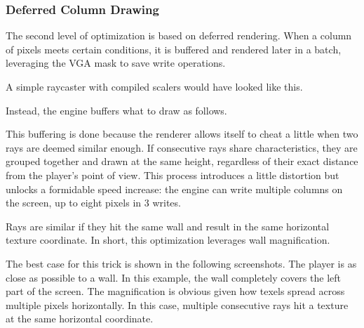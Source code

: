 \subsubsection{Deferred Column Drawing}
The second level of optimization is based on deferred rendering. When a column of pixels meets certain conditions, it is buffered and rendered later in a batch, leveraging the VGA mask to save write operations.\\
\par 
A simple raycaster with compiled scalers would have looked like this.\\

\begin{minipage}{\textwidth}

\end{minipage}
\par
Instead, the engine buffers what to draw as follows.\\
\par
\begin{minipage}{\textwidth}

\end{minipage}

\par
This buffering is done because the renderer allows itself to cheat a little when two rays are deemed similar enough. If consecutive rays share characteristics, they are grouped together and drawn at the same height, regardless of their exact distance from the player's point of view. This process introduces a little distortion but unlocks a formidable speed increase: the engine can write multiple columns on the screen, up to eight pixels in 3 writes.\\
\par
Rays are similar if they hit the same wall and result in the same  horizontal texture coordinate. In short, this optimization leverages wall magnification.\\
\par
The best case for this trick is shown in the following screenshots. The player is as close as possible to a wall. In this example, the wall completely covers the left part of the screen. The magnification is obvious given how texels spread across multiple pixels horizontally. In this case, multiple consecutive rays hit a texture at the same horizontal coordinate.\\
\begin{figure}[H]
 \centering
\end{figure}

